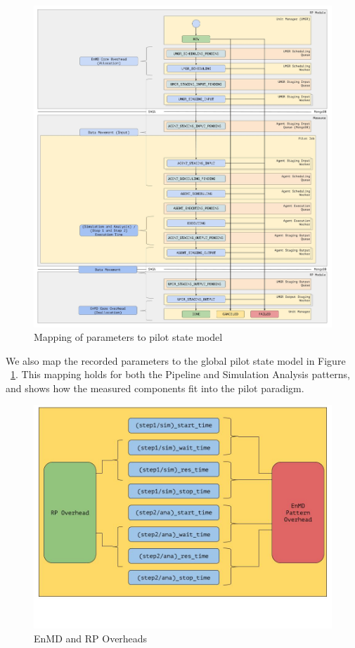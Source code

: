 \documentclass[]{article}
\begin{document}
		\begin{figure}[H]
			\centering
			\includegraphics[scale=.15]{diagrams/enmd_state_model_mapping.jpg}
			\caption{Mapping of parameters to pilot state model}
			\label{fig:param_pilot_state_mapping}
		\end{figure}
		We also map the recorded parameters to the global pilot state model in Figure ~\ref{fig:param_pilot_state_mapping}. This mapping holds for both the Pipeline and Simulation Analysis patterns, and shows how the measured components fit into the pilot paradigm.
		\begin{figure}[H]
			\centering
			\includegraphics[scale=.3]{diagrams/pattern_and_rp_overheads.jpg}
			\caption{EnMD and RP Overheads}
			\label{fig:pattern_rp_overheads}
		\end{figure}
\end{document}
